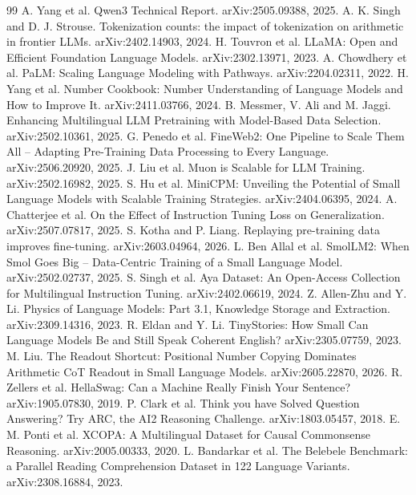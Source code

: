 \documentclass[11pt]{article}
\begin{document}
\begin{thebibliography}{99}\small
{} A. Yang et al. Qwen3 Technical Report. arXiv:2505.09388, 2025.
 A. K. Singh and D. J. Strouse. Tokenization counts: the impact of tokenization on arithmetic in frontier LLMs. arXiv:2402.14903, 2024.
 H. Touvron et al. LLaMA: Open and Efficient Foundation Language Models. arXiv:2302.13971, 2023.
 A. Chowdhery et al. PaLM: Scaling Language Modeling with Pathways. arXiv:2204.02311, 2022.
 H. Yang et al. Number Cookbook: Number Understanding of Language Models and How to Improve It. arXiv:2411.03766, 2024.
 B. Messmer, V. Ali and M. Jaggi. Enhancing Multilingual LLM Pretraining with Model-Based Data Selection. arXiv:2502.10361, 2025.
 G. Penedo et al. FineWeb2: One Pipeline to Scale Them All -- Adapting Pre-Training Data Processing to Every Language. arXiv:2506.20920, 2025.
 J. Liu et al. Muon is Scalable for LLM Training. arXiv:2502.16982, 2025.
 S. Hu et al. MiniCPM: Unveiling the Potential of Small Language Models with Scalable Training Strategies. arXiv:2404.06395, 2024.
 A. Chatterjee et al. On the Effect of Instruction Tuning Loss on Generalization. arXiv:2507.07817, 2025.
 S. Kotha and P. Liang. Replaying pre-training data improves fine-tuning. arXiv:2603.04964, 2026.
 L. Ben Allal et al. SmolLM2: When Smol Goes Big -- Data-Centric Training of a Small Language Model. arXiv:2502.02737, 2025.
 S. Singh et al. Aya Dataset: An Open-Access Collection for Multilingual Instruction Tuning. arXiv:2402.06619, 2024.
 Z. Allen-Zhu and Y. Li. Physics of Language Models: Part 3.1, Knowledge Storage and Extraction. arXiv:2309.14316, 2023.
 R. Eldan and Y. Li. TinyStories: How Small Can Language Models Be and Still Speak Coherent English? arXiv:2305.07759, 2023.
 M. Liu. The Readout Shortcut: Positional Number Copying Dominates Arithmetic CoT Readout in Small Language Models. arXiv:2605.22870, 2026.
 R. Zellers et al. HellaSwag: Can a Machine Really Finish Your Sentence? arXiv:1905.07830, 2019.
 P. Clark et al. Think you have Solved Question Answering? Try ARC, the AI2 Reasoning Challenge. arXiv:1803.05457, 2018.
 E. M. Ponti et al. XCOPA: A Multilingual Dataset for Causal Commonsense Reasoning. arXiv:2005.00333, 2020.
 L. Bandarkar et al. The Belebele Benchmark: a Parallel Reading Comprehension Dataset in 122 Language Variants. arXiv:2308.16884, 2023.

\end{thebibliography}
\end{document}
